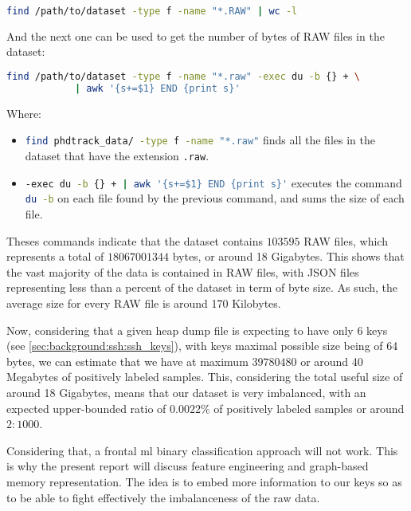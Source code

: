     \begin{lstlisting}[caption={Find the number of RAW files in the dataset}, language=bash]
        find /path/to/dataset -type f -name "*.RAW" | wc -l
    \end{lstlisting}

    And the next one can be used to get the number of bytes of RAW files in the dataset:

    \begin{lstlisting}[caption={Find the number of bytes of RAW files in the dataset}, language=bash]
        find /path/to/dataset -type f -name "*.raw" -exec du -b {} + \
            | awk '{s+=$1} END {print s}'
    \end{lstlisting}

    Where:
    \begin{itemize}
        \item \lstinline[language=bash]!find phdtrack_data/ -type f -name "*.raw"! finds all the files in the dataset that have the extension \lstinline[language=bash]!.raw!.
        \item \lstinline[language=bash]!-exec du -b {} + | awk '{s+=$1} END {print s}'! executes the command \lstinline[language=bash]!du -b! on each file found by the previous command, and sums the size of each file.
    \end{itemize}

    Theses commands indicate that the dataset contains $ 103595 $ RAW files, which represents a total of $ 18067001344 $ bytes, or around 18 Gigabytes. This shows that the vast majority of the data is contained in RAW files, with JSON files representing less than a percent of the dataset in term of byte size. As such, the average size for every RAW file is around 170 Kilobytes. 

    Now, considering that a given heap dump file is expecting to have only 6 keys (see \autoref{sec:background:ssh:ssh_keys}), with keys maximal possible size being of 64 bytes, we can estimate that we have at maximum $ 39780480 $ or around 40 Megabytes of positively labeled samples. This, considering the total useful size of around 18 Gigabytes, means that our dataset is very imbalanced, with an expected upper-bounded ratio of $ 0.0022\% $ of positively labeled samples or around $ 2:1000 $.

    Considering that, a frontal \acrshort{ml} binary classification approach will not work. This is why the present report will discuss feature engineering and graph-based memory representation. The idea is to embed more information to our keys so as to be able to fight effectively the imbalanceness of the raw data.

